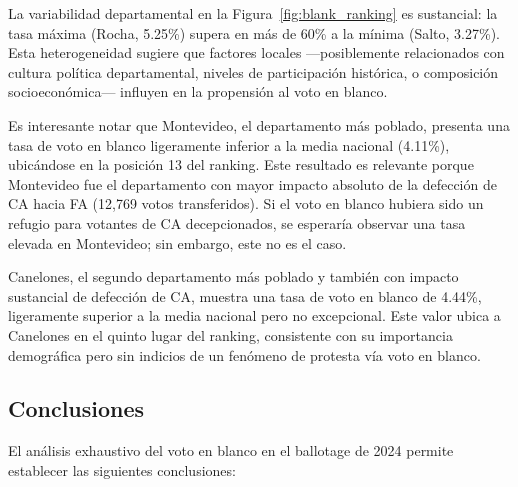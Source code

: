 La variabilidad departamental en la Figura~\ref{fig:blank_ranking} es sustancial: la tasa máxima (Rocha, 5.25\%) supera en más de 60\% a la mínima (Salto, 3.27\%). Esta heterogeneidad sugiere que factores locales ---posiblemente relacionados con cultura política departamental, niveles de participación histórica, o composición socioeconómica--- influyen en la propensión al voto en blanco.

Es interesante notar que Montevideo, el departamento más poblado, presenta una tasa de voto en blanco ligeramente inferior a la media nacional (4.11\%), ubicándose en la posición 13 del ranking. Este resultado es relevante porque Montevideo fue el departamento con mayor impacto absoluto de la defección de CA hacia FA (12,769 votos transferidos). Si el voto en blanco hubiera sido un refugio para votantes de CA decepcionados, se esperaría observar una tasa elevada en Montevideo; sin embargo, este no es el caso.

Canelones, el segundo departamento más poblado y también con impacto sustancial de defección de CA, muestra una tasa de voto en blanco de 4.44\%, ligeramente superior a la media nacional pero no excepcional. Este valor ubica a Canelones en el quinto lugar del ranking, consistente con su importancia demográfica pero sin indicios de un fenómeno de protesta vía voto en blanco.

\subsection{Conclusiones}
\label{subsec:blank_conclusions}

El análisis exhaustivo del voto en blanco en el ballotage de 2024 permite establecer las siguientes conclusiones:

